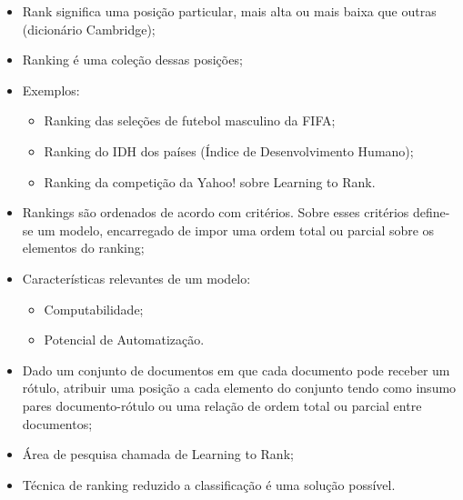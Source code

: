 \begin{frame}
    \begin{itemize}
        \item Rank significa uma posição particular, mais alta ou mais baixa que outras (dicionário Cambridge);
    
        \item Ranking é uma coleção dessas posições;
    
        \item Exemplos:

        \begin{itemize}
            \item Ranking das seleções de futebol masculino da FIFA;
            \item Ranking do IDH dos países (Índice de Desenvolvimento Humano);
            \item Ranking da competição da Yahoo! sobre Learning to Rank.
        \end{itemize}
    \end{itemize}
\end{frame}

\begin{frame}
    \begin{itemize}
        \item Rankings são ordenados de acordo com critérios. Sobre esses critérios define-se um modelo, encarregado de impor uma ordem total ou parcial sobre os elementos do ranking;

        \item Características relevantes de um modelo:

        \begin{itemize}
            \item Computabilidade;
            \item Potencial de Automatização.
        \end{itemize}
    \end{itemize}
\end{frame}

\begin{frame}
    \begin{itemize}
        \item Dado um conjunto de documentos em que cada documento pode receber um rótulo, atribuir uma posição a cada elemento do conjunto tendo como insumo pares documento-rótulo ou uma relação de ordem total ou parcial entre documentos;
    
        \item Área de pesquisa chamada de Learning to Rank;

        \item Técnica de ranking reduzido a classificação é uma solução possível.
    \end{itemize}
\end{frame}